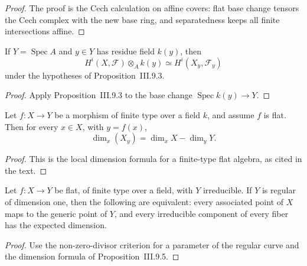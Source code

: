 \begin{proof}

The proof is the Cech calculation on affine covers: flat base change tensors
the Cech complex with the new base ring, and separatedness keeps all finite
intersections affine.

\end{proof}
\begin{corollary}\label{ha-ch3-cor-flat-affine}
If $Y=\operatorname{Spec}A$ and $y\in Y$ has residue field $k(y)$, then
\[
H^i(X,\mathcal F)\otimes_A k(y)\simeq H^i(X_y,\mathcal F_y)
\]
under the hypotheses of Proposition~III.9.3.
\end{corollary}
\begin{proof}

Apply Proposition~III.9.3 to the base change $\operatorname{Spec}k(y)\to Y$.

\end{proof}
\begin{proposition}\label{ha-ch3-prop-flat-fibers}
Let $f:X\to Y$ be a morphism of finite type over a field $k$, and assume
$f$ is flat.  Then for every $x\in X$, with $y=f(x)$,
\[
\dim_x(X_y)=\dim_xX-\dim_yY.
\]

\end{proposition}
\begin{proof}

This is the local dimension formula for a finite-type flat algebra, as cited
in the text.

\end{proof}
\begin{corollary}\label{ha-ch3-cor-flat-curve}
Let $f:X\to Y$ be flat, of finite type over a field, with $Y$ irreducible.
If $Y$ is regular of dimension one, then the following are equivalent: every
associated point of $X$ maps to the generic point of $Y$, and every
irreducible component of every fiber has the expected dimension.
\end{corollary}
\begin{proof}

Use the non-zero-divisor criterion for a parameter of the regular curve and
the dimension formula of Proposition~III.9.5.

\end{proof}

